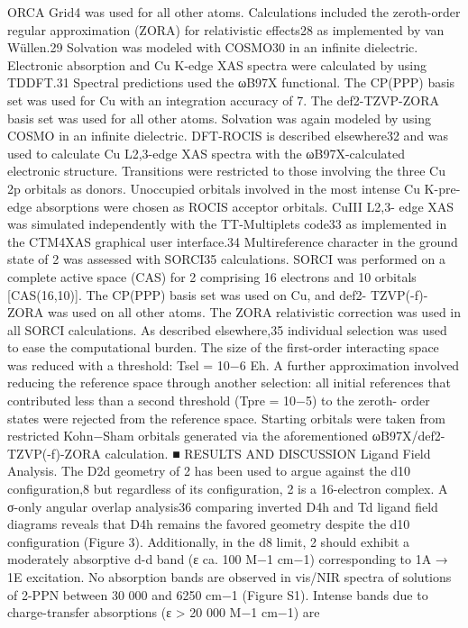 ORCA Grid4 was used for all other atoms. Calculations included the
zeroth-order regular approximation (ZORA) for relativistic eﬀects28 as
implemented by van Wüllen.29 Solvation was modeled with
COSMO30 in an inﬁnite dielectric.
Electronic absorption and Cu K-edge XAS spectra were calculated
by using TDDFT.31 Spectral predictions used the ωB97X functional.
The CP(PPP) basis set was used for Cu with an integration accuracy
of 7. The def2-TZVP-ZORA basis set was used for all other atoms.
Solvation was again modeled by using COSMO in an inﬁnite
dielectric.
DFT-ROCIS is described elsewhere32 and was used to calculate Cu
L2,3-edge XAS spectra with the ωB97X-calculated electronic structure.
Transitions were restricted to those involving the three Cu 2p orbitals
as donors. Unoccupied orbitals involved in the most intense Cu K-pre-
edge absorptions were chosen as ROCIS acceptor orbitals. CuIII L2,3-
edge XAS was simulated independently with the TT-Multiplets code33
as implemented in the CTM4XAS graphical user interface.34
Multireference character in the ground state of 2 was assessed with
SORCI35 calculations. SORCI was performed on a complete active
space (CAS) for 2 comprising 16 electrons and 10 orbitals
[CAS(16,10)]. The CP(PPP) basis set was used on Cu, and def2-
TZVP(-f)-ZORA was used on all other atoms. The ZORA relativistic
correction was used in all SORCI calculations. As described
elsewhere,35 individual selection was used to ease the computational
burden. The size of the ﬁrst-order interacting space was reduced with a
threshold: Tsel = 10−6 Eh. A further approximation involved reducing
the reference space through another selection: all initial references that
contributed less than a second threshold (Tpre = 10−5) to the zeroth-
order states were rejected from the reference space. Starting orbitals
were taken from restricted Kohn−Sham orbitals generated via the
aforementioned ωB97X/def2-TZVP(-f)-ZORA calculation.
■ RESULTS AND DISCUSSION
Ligand Field Analysis. The D2d geometry of 2 has been
used to argue against the d10 conﬁguration,8 but regardless of its
conﬁguration, 2 is a 16-electron complex. A σ-only angular
overlap analysis36 comparing inverted D4h and Td ligand ﬁeld
diagrams reveals that D4h remains the favored geometry despite
the d10 conﬁguration (Figure 3). Additionally, in the d8 limit, 2
should exhibit a moderately absorptive d-d band (ε ca. 100 M−1
cm−1) corresponding to 1A → 1E excitation. No absorption
bands are observed in vis/NIR spectra of solutions of 2-PPN
between 30 000 and 6250 cm−1 (Figure S1). Intense bands due
to charge-transfer absorptions (ε > 20 000 M−1 cm−1) are
